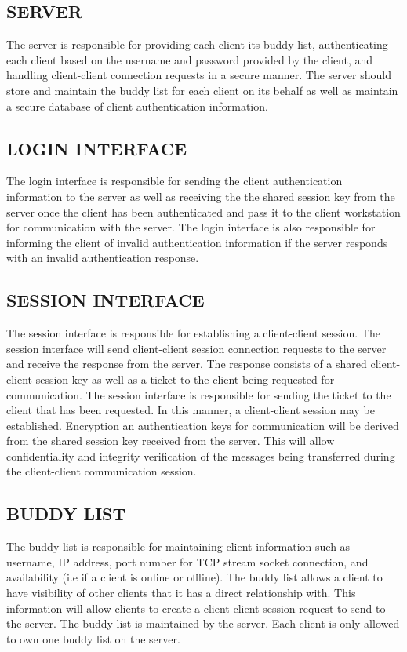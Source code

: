 \documentclass[twoside,letterpaper]{article}
\begin{document}
\subsection{SERVER}
The server is responsible for providing each client its buddy list, authenticating each client based on the
username and password provided by the client, and handling client-client connection requests in a secure manner. The server should store and maintain the buddy list for each client on its behalf as well as maintain a
secure database of client authentication information.

\bigskip

\subsection{LOGIN INTERFACE}
The login interface is responsible for sending the client authentication information to the server as well as
receiving the the shared session key from the server once the client has been authenticated and pass it to the client workstation for communication with the server. The login interface is also responsible for informing the
client of invalid authentication information if the server responds with an invalid authentication response.

\bigskip
 
\subsection{SESSION INTERFACE}
The session interface is responsible for establishing a client-client session. The session interface will send
client-client session connection requests to the server and receive the response from the server. The response
consists of a shared client-client session key as well as a ticket to the client being requested for
communication. The session interface is responsible for sending the ticket to the client that has been
requested. In this manner, a client-client session may be established. Encryption an authentication keys for
communication will be derived from the shared session key received from the server. This will allow
confidentiality and integrity verification of the messages being transferred during the client-client communication session.

\bigskip
 
\subsection{BUDDY LIST}
The buddy list is responsible for maintaining client information such as username, IP address, port number for
TCP stream socket connection, and availability (i.e if a client is online or offline). The buddy list allows a client to
have visibility of other clients that it has a direct relationship with. This information will allow clients to create
a client-client session request to send to the server. The buddy list is maintained by the server. Each client
is only allowed to own one buddy list on the server. 
\end{document}
